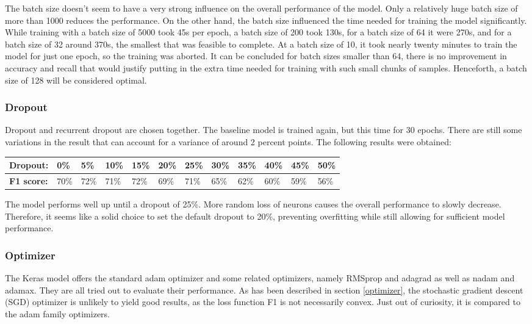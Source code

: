 \documentclass[
a4paper,
pagesize,
pdftex,
12pt,
twoside, %
BCOR=5mm, %
ngerman,
fleqn,
final,
]{scrartcl}
\begin{document}
	The batch size doesn't seem to have a very strong influence on the overall performance of the model. Only a relatively huge batch size of more than 1000 reduces the performance. On the other hand, the batch size influenced the time needed for training the model significantly. While training with a batch size of 5000 took 45s per epoch, a batch size of 200 took 130s, for a batch size of 64 it were 270s, and for a batch size of 32 around 370s, the smallest that was feasible to complete. At a batch size of 10, it took nearly twenty minutes to train the model for just one epoch, so the training was aborted. It can be concluded for batch sizes smaller than 64, there is no improvement in accuracy and recall that would justify putting in the extra time needed for training with such small chunks of samples. Henceforth, a batch size of 128 will be considered optimal.
	
	\subsubsection{Dropout}
	Dropout and recurrent dropout are chosen together. The baseline model is trained again, but this time for 30 epochs. There are still some variations in the result that can account for a variance of around 2 percent points. The following results were obtained:
	
	\begin{tabular} { | p{2cm} || p{0.7cm} | p{0.7cm} | p{0.7cm} | p{0.7cm}  | p{0.7cm} | p{0.7cm} | p{0.7cm} | p{0.7cm} | p{0.7cm} | p{0.7cm} | p{0.7cm} |}
		\hline
		\textbf{Dropout:}  & 0\% & 5\% & 10\% & 15\%   & 20\% & 25\% & 30\% & 35\% & 40\% & 45\% & 50\% \\   
		\hline
		\textbf{F1 score:} & 70\% & 72\% & 71\% & 72\% & 69\% & 71\% & 65\% & 62\% & 60\% & 59\% & 56\% \\
		\hline
		\hline
	\end{tabular}
	
	The model performs well up until a dropout of 25\%. More random loss of neurons causes the overall performance to slowly decrease. Therefore, it seems like a solid choice to set the default dropout to 20\%, preventing overfitting while still allowing for sufficient model performance.
	
	\subsubsection{Optimizer}
	
	The Keras model offers the standard adam optimizer and some related optimizers, namely RMSprop and adagrad as well as nadam and adamax. They are all tried out to evaluate their performance. As has been described in section \ref{optimizer}, the stochastic gradient descent (SGD) optimizer is unlikely to yield good results, as the loss function F1 is not necessarily convex. Just out of curiosity, it is compared to the adam family optimizers. 
	
\end{document}
